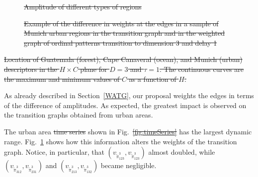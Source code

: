 \documentclass[journal]{IEEEtran}
\providecommand{\DIFaddtex}[1]{{\protect\color{blue}\uwave{#1}}} %
\providecommand{\DIFdeltex}[1]{{\protect\color{red}\sout{#1}}}                      %
\providecommand{\DIFaddbegin}{} %
\providecommand{\DIFaddend}{} %
\providecommand{\DIFdelbegin}{} %
\providecommand{\DIFdelend}{} %
\providecommand{\DIFdelFL}[1]{\DIFdel{#1}} %
\providecommand{\DIFdelendFL}{} %
\providecommand{\DIFadd}[1]{\texorpdfstring{\DIFaddtex{#1}}{#1}} %
\providecommand{\DIFdel}[1]{\texorpdfstring{\DIFdeltex{#1}}{}} %
\newcommand{\DIFscaledelfig}{0.5}
\newlength{\DIFdelgraphicswidth} %
\newlength{\DIFdelgraphicsheight} %
\newcommand{\DIFaddincludegraphics}[2][]{{\color{blue}\fbox{\DIFOincludegraphics[#1]{#2}}}} %
\newcommand{\DIFdelincludegraphics}[2][]{%
\sbox{\DIFdelgraphicsbox}{\DIFOincludegraphics[#1]{#2}}%
\settoboxwidth{\DIFdelgraphicswidth}{\DIFdelgraphicsbox} %
\settoboxtotalheight{\DIFdelgraphicsheight}{\DIFdelgraphicsbox} %
\scalebox{\DIFscaledelfig}{%
\parbox[b]{\DIFdelgraphicswidth}{\usebox{\DIFdelgraphicsbox}\\[-\baselineskip] \rule{\DIFdelgraphicswidth}{0em}}\llap{\resizebox{\DIFdelgraphicswidth}{\DIFdelgraphicsheight}{%
\setlength{\unitlength}{\DIFdelgraphicswidth}%
\begin{picture}(1,1)%
\thicklines\linethickness{2pt} %
{\color[rgb]{1,0,0}\put(0,0){\framebox(1,1){}}}%
{\color[rgb]{1,0,0}\put(0,0){\line( 1,1){1}}}%
{\color[rgb]{1,0,0}\put(0,1){\line(1,-1){1}}}%
\end{picture}%
}\hspace*{3pt}}} %
} %
\DeclareRobustCommand{\DIFaddbegin}{\DIFOaddbegin \let\includegraphics\DIFaddincludegraphics} %
\DeclareRobustCommand{\DIFaddend}{\DIFOaddend \let\includegraphics\DIFOincludegraphics} %
\DeclareRobustCommand{\DIFdelbegin}{\DIFOdelbegin \let\includegraphics\DIFdelincludegraphics} %
\DeclareRobustCommand{\DIFdelend}{\DIFOaddend \let\includegraphics\DIFOincludegraphics} %
\DeclareRobustCommand{\DIFdelendFL}{\DIFOaddendFL \let\includegraphics\DIFOincludegraphics} %
\begin{document}
\begin{figure}
{%
\DIFdelFL{Amplitude of different types of regions}}

{%
\DIFdelFL{Example of the difference in weights at the edges in a sample of Munich urban regions in the transition graph and in the weighted graph of ordinal patterns
		transition to dimension 3 and delay 1}}
\DIFdelendFL \label{fig:graphs}
\end{figure}

\DIFdelbegin %
{%
\DIFdelFL{Location of Guatemala (forest), Cape Canaveral (ocean), and Munich (urban) descriptors in the $H \times C$ plane for $D=3$ and $\tau=1$. 
		The continuous curves are the maximum and minimum values of $C$ as a function of $H$.}}

\DIFdelend As already described in Section~\ref{WATG}, our proposal weights the edges in terms of the difference of amplitudes.
As expected, the greatest impact is observed on the transition graphs obtained from urban areas.
\DIFdelbegin %

\DIFdelend The urban area \DIFdelbegin \DIFdel{time series }\DIFdelend \DIFaddbegin \DIFadd{\mbox{1-D} signal }\DIFaddend shown in Fig.~\DIFdelbegin \DIFdel{\ref{fig:timeSeries} }\DIFdelend \DIFaddbegin \DIFadd{\ref{fig:samples&Series} }\DIFaddend has the largest dynamic range.
Fig.~\ref{fig:graphs} shows how this information alters the weights of the transition graph.
Notice, in particular, that 
$(v_{\widetilde \pi^3_{123}}, v_{\widetilde \pi^3_{123}})$ almost doubled, while 
$(v_{\widetilde \pi^3_{312}}, v_{\widetilde \pi^3_{231}})$ and $(v_{\widetilde \pi^3_{213}}, v_{\widetilde \pi^3_{132}})$ became negligible.
\DIFdelbegin %
\end{document}
